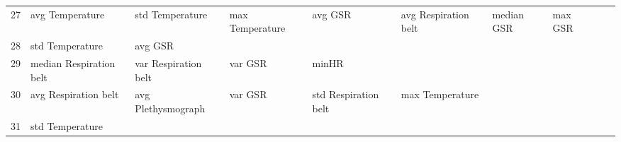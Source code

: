 \begin{landscape}
\begin{table}[]
\begin{tabular}{l|llllllll}
27       & avg Temperature         & std Temperature       & max Temperature         & avg GSR                 & avg Respiration belt    & median GSR            & max GSR              &          &                      &        \\
28       & std Temperature         & avg GSR               &                         &                         &                         &                       &                      &          &                      &        \\
29       & median Respiration belt & var Respiration belt  & var GSR                 & minHR                   &                         &                       &                      &          &                      &        \\
30       & avg Respiration belt    & avg Plethysmograph    & var GSR                 & std Respiration belt    & max Temperature         &                       &                      &          &                      &        \\
31       & std Temperature         &                       &                         &                         &                         &                       &                      &          &                      &        \\
\end{tabular}
\end{table}
\end{landscape}
\clearpage
